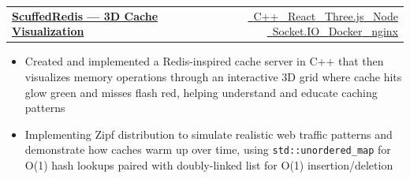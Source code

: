 \documentclass[letterpaper,10pt]{article}
\makeatletter
\newenvironment{ProjectNotes}{%
  \begingroup\fontsize{9.5}{11}\selectfont
  \begin{itemize}[label=--,leftmargin=0.2in,topsep=2pt,itemsep=2pt,parsep=0pt,partopsep=0pt]
}{%
  \end{itemize}\endgroup\vspace{4pt}
}
\newcommand{\TechTag}[1]{{\footnotesize #1}}
\newcommand{\IconTag}[2]{#1\ \TechTag{#2}}
\providecommand{\icCpp}{\faIcon{copyright}}
\providecommand{\icTS}{\faIcon{js-square}}
\providecommand{\icReact}{\faIcon{react}}
\providecommand{\icTailwind}{\faIcon{wind}}
\providecommand{\icPixi}{\faIcon{shapes}}
\providecommand{\icThree}{\faIcon{cube}}
\providecommand{\icNode}{\faIcon{node-js}}
\providecommand{\icNginx}{\faIcon{server}}
\providecommand{\icDocker}{\faIcon{docker}}
\providecommand{\icVite}{\faIcon{bolt}}
\providecommand{\icSocketIO}{\faIcon{plug}}
\providecommand{\icXterm}{\faIcon{terminal}}
\providecommand{\icReactFlow}{\faIcon{project-diagram}}
\newcommand{\ProjectRow}[4]{%
  \vspace{0pt}
  \begin{tabular*}{\textwidth}{@{}l@{\extracolsep{\fill}}r@{}}
    \textbf{\href{#2}{#1}} & {\footnotesize \href{#3}{#4}}
  \end{tabular*}\par
  \vspace{-1pt}
}
\makeatother
\begin{document}
\ProjectRow{ScuffedRedis — 3D Cache Visualization}
{https://github.com/ndg8743/ScuffedRedis}
{gopee.dev/scuffedredis}
{\IconTag{\icCpp}{C++} \IconTag{\icReact}{React} \IconTag{\icThree}{Three.js} \IconTag{\icNode}{Node} \IconTag{\icSocketIO}{Socket.IO} \IconTag{\icDocker}{Docker} \IconTag{\icNginx}{nginx}}
\begin{ProjectNotes}
  \item Created and implemented a Redis-inspired cache server in C++ that then visualizes memory operations through an interactive 3D grid where cache hits glow green and misses flash red, helping understand and educate caching patterns
  \item Implementing Zipf distribution to simulate realistic web traffic patterns and demonstrate how caches warm up over time, using \texttt{std::unordered\_map} for O(1) hash lookups paired with doubly-linked list for O(1) insertion/deletion
\end{ProjectNotes}

\end{document}
